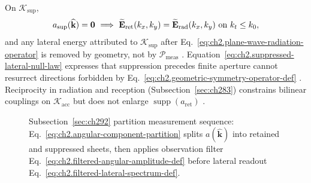On \(\mathcal{K}_{\mathrm{sup}}\),
\begin{equation}
\label{eq:ch2.suppressed-lateral-null-law}
a_{\mathrm{sup}}(\widehat{\mathbf{k}})=\mathbf{0}
\ \Longrightarrow\
\widetilde{\mathbf{E}}_{\mathrm{ret}}(k_x,k_y)=\widetilde{\mathbf{E}}_{\mathrm{rad}}(k_x,k_y)
\ \text{on}\ k_t\le k_0,
\end{equation}
and any lateral energy attributed to \(\mathcal{K}_{\mathrm{sup}}\) after
Eq.~\eqref{eq:ch2.plane-wave-radiation-operator} is removed by geometry, not by
\(\mathcal{P}_{\mathrm{meas}}\) \cite{stratton1941}. Equation~\eqref{eq:ch2.suppressed-lateral-null-law}
expresses that suppression precedes finite aperture cannot resurrect directions
forbidden by Eq.~\eqref{eq:ch2.geometric-symmetry-operator-def}
\cite{harrington2001}. Reciprocity in radiation and reception (Subsection~\ref{sec:ch283})
constrains bilinear couplings on \(\mathcal{K}_{\mathrm{acc}}\) but does not enlarge
\(\operatorname{supp}(a_{\mathrm{ret}})\) \cite{stratton1941}.
\begin{figure}[t]
\centering
{}
\caption{Subsection~\ref{sec:ch292} partition measurement sequence:
Eq.~\eqref{eq:ch2.angular-component-partition} splits \(a(\widehat{\mathbf{k}})\) into retained
and suppressed sheets, then applies observation filter
Eq.~\eqref{eq:ch2.filtered-angular-amplitude-def} before lateral readout
Eq.~\eqref{eq:ch2.filtered-lateral-spectrum-def}.}
\label{fig:ch2.retained-suppressed-filter-measurement chain}
\end{figure}
